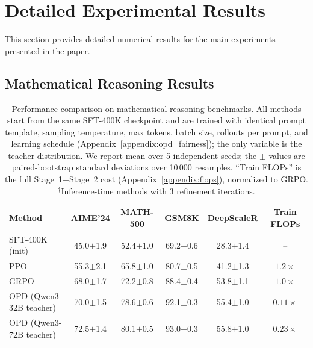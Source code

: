 \documentclass{article}
\theoremstyle{plain}
\theoremstyle{definition}
\theoremstyle{remark}
\begin{document}



\newpage
\appendix
\onecolumn

\section{Detailed Experimental Results}
\label{appendix:detailed_results}

This section provides detailed numerical results for the main experiments presented in the paper.

\subsection{Mathematical Reasoning Results}

\begin{table}[h]
\centering
\caption{Performance comparison on mathematical reasoning benchmarks. All methods start from the same SFT-400K checkpoint and are trained with identical prompt template, sampling temperature, max tokens, batch size, rollouts per prompt, and learning schedule (Appendix~\ref{appendix:opd_fairness}); the only variable is the teacher distribution. We report mean over 5 independent seeds; the $\pm$ values are paired-bootstrap standard deviations over 10\,000 resamples. ``Train FLOPs'' is the full Stage~1+Stage~2 cost (Appendix~\ref{appendix:flops}), normalized to GRPO. $^\dagger$Inference-time methods with 3 refinement iterations.}
\label{tab:math_main_appendix}
\vspace{0.5em}
\small
\begin{tabular}{@{}lccccc@{}}
\toprule
\textbf{Method} & \textbf{AIME'24} & \textbf{MATH-500} & \textbf{GSM8K} & \textbf{DeepScaleR} & \textbf{Train FLOPs} \\
\midrule
SFT-400K (init)               & 45.0$\pm$1.9 & 52.4$\pm$1.0 & 69.2$\pm$0.6 & 28.3$\pm$1.4 & -- \\
\midrule
PPO                           & 55.3$\pm$2.1 & 65.8$\pm$1.0 & 80.7$\pm$0.5 & 41.2$\pm$1.3 & $1.2\times$ \\
GRPO                          & 68.0$\pm$1.7 & 72.2$\pm$0.8 & 88.4$\pm$0.4 & 53.8$\pm$1.1 & $1.0\times$ \\
OPD (Qwen3-32B teacher)       & 70.0$\pm$1.5 & 78.6$\pm$0.6 & 92.1$\pm$0.3 & 55.4$\pm$1.0 & $0.11\times$ \\
OPD (Qwen3-72B teacher)       & 72.5$\pm$1.4 & 80.1$\pm$0.5 & 93.0$\pm$0.3 & 55.8$\pm$1.0 & $0.23\times$ \\

\end{tabular}
\end{table}
\end{document}
